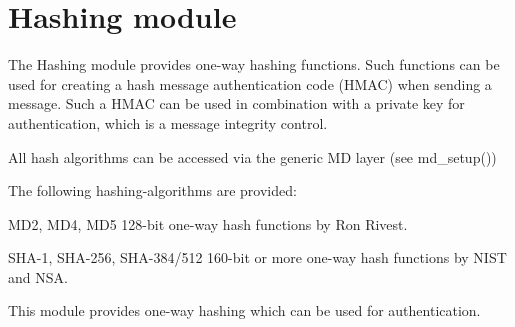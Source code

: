 \hypertarget{group__hashing__module}{\section{Hashing module}
\label{group__hashing__module}
}
The Hashing module provides one-\/way hashing functions. Such functions can be used for creating a hash message authentication code (H\-M\-A\-C) when sending a message. Such a H\-M\-A\-C can be used in combination with a private key for authentication, which is a message integrity control.

All hash algorithms can be accessed via the generic M\-D layer (see {\ttfamily md\-\_\-setup()})

The following hashing-\/algorithms are provided\-:
\begin{DoxyItemize}
\item M\-D2, M\-D4, M\-D5 128-\/bit one-\/way hash functions by Ron Rivest.
\item S\-H\-A-\/1, S\-H\-A-\/256, S\-H\-A-\/384/512 160-\/bit or more one-\/way hash functions by N\-I\-S\-T and N\-S\-A.
\end{DoxyItemize}

This module provides one-\/way hashing which can be used for authentication. 